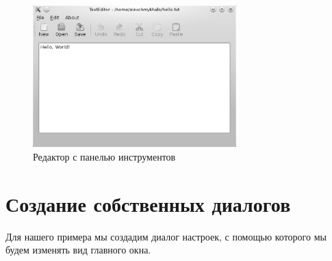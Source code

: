 \begin{figure}[htb]
\begin{center}
\includegraphics[width=0.7\textwidth]{img/ris_15_9}
\caption[Редактор с панелью инструментов]{Редактор с панелью инструментов}
\label{ch15:refDrawing8}
\end{center}
\end{figure}


\section[Создание собственных диалогов]{Создание собственных диалогов}
Для нашего примера мы создадим диалог настроек, с помощью которого мы будем изменять вид главного окна. 

